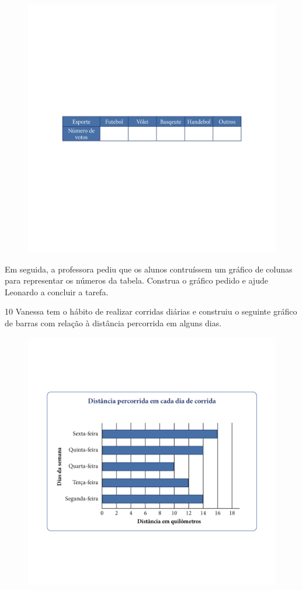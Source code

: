 \begin{figure}[htpb!]
\includegraphics[width=\textwidth]{../ilustracoes/MAT5/SAEB_5ANO_MAT_figura62.png}
\end{figure}

Em seguida, a professora pediu que os alunos contruíssem um gráfico de
colunas para representar os números da tabela. Construa o gráfico pedido
e ajude Leonardo a concluir a tarefa.


\num{10} Vanessa tem o hábito de realizar corridas diárias e construiu o
seguinte gráfico de barras com relação à distância percorrida em alguns dias.

\begin{figure}[htpb!]
\includegraphics[width=\textwidth]{../ilustracoes/MAT5/SAEB_5ANO_MAT_figura63.png}
\end{figure}

